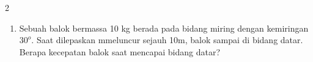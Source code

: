 \documentclass[10pt,a4paper]{article}
\begin{document}
\begin{multicols*} {2}
\begin{enumerate}
    
    \item Sebuah balok bermassa 10 kg berada pada bidang miring dengan kemiringan $30^o$. Saat dilepaskan mmeluncur sejauh 10m, balok sampai di bidang datar. Berapa kecepatan balok saat mencapai bidang datar?
    \
    
\end{enumerate}

\end{multicols*}


 
\end{document}
